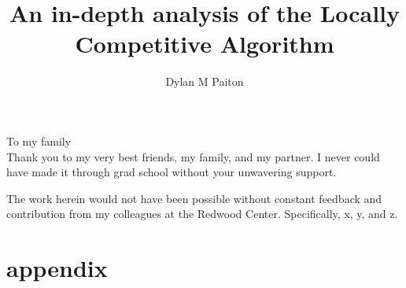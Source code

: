\documentclass{ucbthesis}
\begin{document}

\title{An in-depth analysis of the Locally Competitive Algorithm}
\author{Dylan M Paiton}


\maketitle
\approvalpage
\copyrightpage



\begin{frontmatter}

\begin{dedication}
\null\vfil
\begin{center}
To my family\\\vspace{12pt}
Thank you to my very best friends, my family, and my partner. I never could have made it through grad school without your unwavering support.
\end{center}
\vfil\null
\end{dedication}


\tableofcontents
\clearpage
\listoffigures
\clearpage
\listoftables

\begin{acknowledgements}
The work herein would not have been possible without constant feedback and contribution from my colleagues at the Redwood Center. Specifically, x, y, and z.
\end{acknowledgements}

\end{frontmatter}

\pagestyle{headings}


\label{ch:intro}

\label{ch:iso}
\label{ch:applications}
\label{ch:hierarchicalsc}


 \appendix
 \chapter{appendix}

\printbibliography
\end{document}
